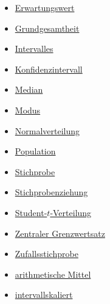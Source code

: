 \documentclass[
]{book}
\providecommand{\tightlist}{%
  \setlength{\itemsep}{0pt}\setlength{\parskip}{0pt}}
\theoremstyle{definition}
\theoremstyle{definition}
\theoremstyle{definition}
\theoremstyle{definition}
\theoremstyle{remark}
\begin{document}
\begin{itemize}
\tightlist
\item
  \hyperref[customdef-erwartungswert]{Erwartungswert}
\item
  \hyperref[customdef-grundgesamtheit]{Grundgesamtheit}
\item
  \hyperref[customdef-interval]{Intervalles}
\item
  \hyperref[customdef-confidence-interval]{Konfidenzintervall}
\item
  \hyperref[customdef-median]{Median}
\item
  \hyperref[customdef-modus]{Modus}
\item
  \hyperref[customdef-normalverteilung]{Normalverteilung}
\item
  \hyperref[customdef-population]{Population}
\item
  \hyperref[customdef-stichprobe]{Stichprobe}
\item
  \hyperref[customdef-stichprobenziehung]{Stichprobenziehung}
\item
  \hyperref[customdef-student-verteilung]{Student-\(t\)-Verteilung}
\item
  \hyperref[customdef-zentraler-grenzwertsatz]{Zentraler Grenzwertsatz}
\item
  \hyperref[customdef-zufallsstichprobe]{Zufallsstichprobe}
\item
  \hyperref[customdef-arithmetisches-mittel]{arithmetische Mittel}
\item
  \hyperref[customdef-intervallskaliert]{intervallskaliert}
\end{itemize}

  
\end{document}
